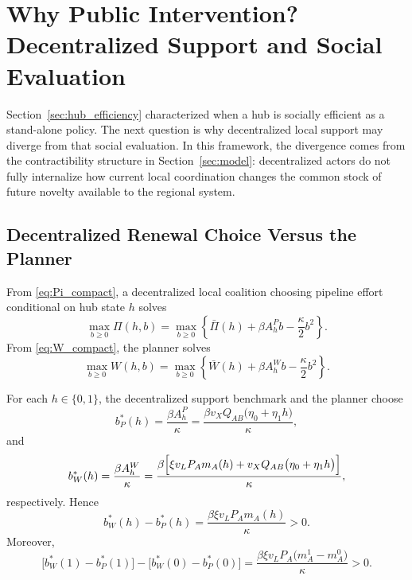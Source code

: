 \section{Why Public Intervention? Decentralized Support and Social Evaluation}
\label{sec:short_run}

Section~\ref{sec:hub_efficiency} characterized when a hub is socially efficient as a stand-alone policy. The next question is why decentralized local support may diverge from that social evaluation. In this framework, the divergence comes from the contractibility structure in Section~\ref{sec:model}: decentralized actors do not fully internalize how current local coordination changes the common stock of future novelty available to the regional system.

\subsection{Decentralized Renewal Choice Versus the Planner}

From \eqref{eq:Pi_compact}, a decentralized local coalition choosing pipeline effort conditional on hub state $h$ solves
\[
\max_{b\ge 0}\Pi(h,b)
=
\max_{b\ge 0}
\left\{
\bar\Pi(h)+\beta A_h^P b-\frac{\kappa}{2}b^2
\right\}.
\]
From \eqref{eq:W_compact}, the planner solves
\[
\max_{b\ge 0}W(h,b)
=
\max_{b\ge 0}
\left\{
\bar W(h)+\beta A_h^W b-\frac{\kappa}{2}b^2
\right\}.
\]

\begin{proposition}
\label{prop:renewal_gap}
For each $h\in\{0,1\}$, the decentralized support benchmark and the planner choose
\begin{equation}
b_P^*(h)=\frac{\beta A_h^P}{\kappa}
=
\frac{\beta v_X Q_{AB}\bigl(\eta_0+\eta_1 h\bigr)}{\kappa},
\label{eq:bPstar}
\end{equation}
and
\begin{equation}
b_W^*(h)=\frac{\beta A_h^W}{\kappa}
=
\frac{\beta\Bigl[\xi v_L P_A m_A(h)+v_X Q_{AB}\bigl(\eta_0+\eta_1 h\bigr)\Bigr]}{\kappa},
\label{eq:bWstar}
\end{equation}
respectively. Hence
\begin{equation}
b_W^*(h)-b_P^*(h)
=
\frac{\beta\xi v_L P_A m_A(h)}{\kappa}
>0.
\label{eq:renewal_gap}
\end{equation}
Moreover,
\begin{equation}
\bigl[b_W^*(1)-b_P^*(1)\bigr]-\bigl[b_W^*(0)-b_P^*(0)\bigr]
=
\frac{\beta\xi v_L P_A\bigl(m_A^1-m_A^0\bigr)}{\kappa}
>0.
\label{eq:renewal_gap_hub}
\end{equation}
\end{proposition}

